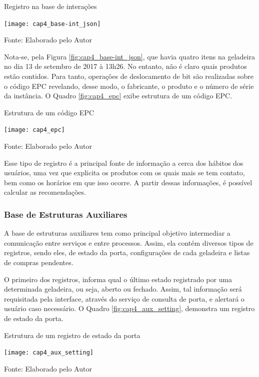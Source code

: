 \begin{quadro}[htb]
    \caption{Registro na base de interações}
    \label{fig:cap4_base-int_json}
    \texttt{[image: cap4\_base-int\_json]}
    
    \footnotesize{Fonte: Elaborado pelo Autor}
\end{quadro}

Nota-se, pela Figura \ref{fig:cap4_base-int_json}, que havia quatro itens na geladeira no dia 13 de setembro de 2017 à 13h26. No entanto, não é claro quais produtos estão contidos. Para tanto, operações de deslocamento de bit são realizadas sobre o código EPC revelando, desse modo, o fabricante, o produto e o número de série da instância. O Quadro \ref{fig:cap4_epc} exibe estrutura de um código EPC.

\begin{quadro}[htb]
    \caption{Estrutura de um código EPC}
    \label{fig:cap4_epc}
    \texttt{[image: cap4\_epc]}
    
    \footnotesize{Fonte: Elaborado pelo Autor}
\end{quadro}

Esse tipo de registro é a principal fonte de informação a cerca dos hábitos dos usuários, uma vez que explicita os produtos com os quais  mais se tem contato, bem como os horários em que isso ocorre. A partir dessas informações, é possível calcular as recomendações.


\ProximoForaDoSumario 
\subsubsection{Base de Estruturas Auxiliares}  \label{sssec:base_est-aux}

A base de estruturas auxiliares tem como principal objetivo intermediar a comunicação entre serviços e entre processos. Assim, ela contém diversos tipos de registros, sendo eles, de estado da porta, configurações de cada geladeira e listas de compras pendentes.

O primeiro dos registros, informa qual o último estado registrado por uma determinada geladeira, ou seja, aberto ou fechado. Assim, tal informação será requisitada pela interface, através do serviço de consulta de porta, e alertará o usuário caso necessário. O Quadro \ref{fig:cap4_aux_setting}, demonstra um registro de estado da porta.

\begin{quadro}[htb]
    \caption{Estrutura de um registro de estado da porta}
    \label{fig:cap4_aux_setting}
    \texttt{[image: cap4\_aux\_setting]}
    
    \footnotesize{Fonte: Elaborado pelo Autor}
\end{quadro}

